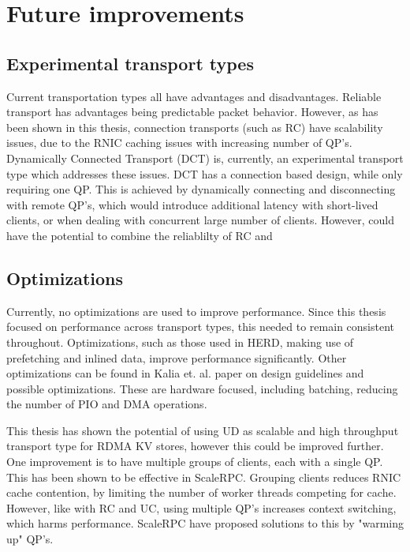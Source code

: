 
\chapter{Future improvements}\label{ch:future-improvements} %



\ifpdf
    \graphicspath{{7/figures/PNG/}{7/figures/PDF/}{7/figures/}}
\else
    \graphicspath{{7/figures/EPS/}{7/figures/}}
\fi


%
\section{Experimental transport types}
Current transportation types all have advantages and disadvantages.
Reliable transport has advantages being predictable packet behavior.
However, as has been shown in this thesis, connection transports (such as RC) have scalability issues, due to the RNIC caching issues with increasing number of QP's.
Dynamically Connected Transport (DCT) is, currently, an experimental transport type which addresses these issues.
DCT has a connection based design, while only requiring one QP.
This is achieved by dynamically connecting and disconnecting with remote QP's, which would introduce additional latency with short-lived clients, or when dealing with concurrent large number of clients.
However, could have the potential to combine the reliablilty of RC and

\section{Optimizations}
Currently, no optimizations are used to improve performance.
Since this thesis focused on performance across transport types, this needed to remain consistent throughout.
Optimizations, such as those used in HERD, making use of prefetching and inlined data, improve performance significantly.
Other optimizations can be found in Kalia et. al. paper on design guidelines and possible optimizations\cite{kalia2016design}.
These are hardware focused, including batching, reducing the number of PIO and DMA operations.

This thesis has shown the potential of using UD as scalable and high throughput transport type for RDMA KV stores, however this could be improved further.
One improvement is to have multiple groups of clients, each with a single QP.
This has been shown to be effective in ScaleRPC\cite{chen2019scalable}.
Grouping clients reduces RNIC cache contention, by limiting the number of worker threads competing for cache.
However, like with RC and UC, using multiple QP's increases context switching, which harms performance.
ScaleRPC have proposed solutions to this by "warming up" QP's.

